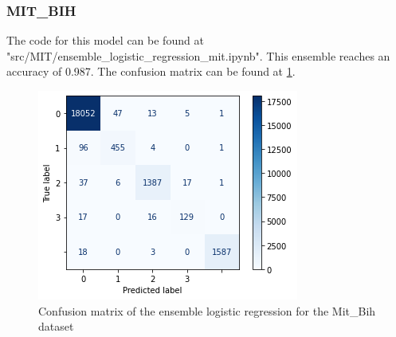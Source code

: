 \documentclass[11pt]{scrartcl}
\begin{document}
\subsubsection{MIT\_BIH}
The code for this model can be found at "src/MIT/ensemble\_logistic\_regression\_mit.ipynb".
This ensemble reaches an accuracy of 0.987. The confusion matrix can be found at \ref{fig:confusion_logistic_mit}.
\begin{figure}[htp]
\centering
\includegraphics[width=.50\textwidth]{../models_performance_graphs/mit/ensemble_logistic_confusion_mit.png}
\caption{Confusion matrix of the ensemble logistic regression for the Mit\_Bih dataset}
\label{fig:confusion_logistic_mit}
\end{figure}


\end{document}
